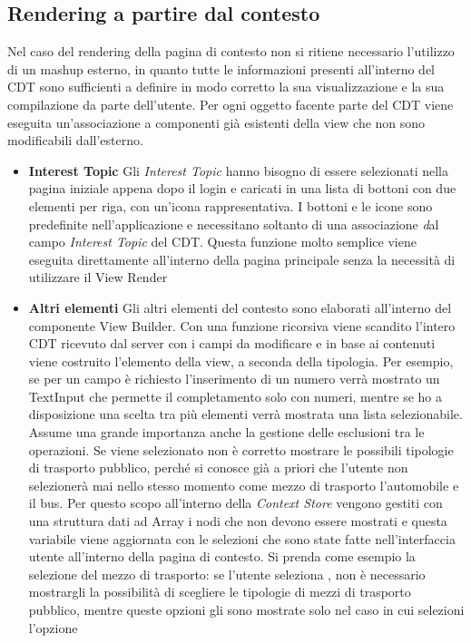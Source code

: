 \subsection{Rendering a partire dal contesto}

Nel caso del rendering della pagina di contesto non si ritiene necessario l'utilizzo di un mashup esterno, in quanto tutte le informazioni presenti all'interno del CDT sono sufficienti a definire in modo corretto la sua visualizzazione e la sua compilazione da parte dell'utente. %
Per ogni oggetto facente parte del CDT viene eseguita un'associazione a componenti già esistenti della view che non sono modificabili dall'esterno.

\begin{itemize}
	\item \textbf{Interest Topic}
	Gli \emph{Interest Topic} hanno bisogno di essere selezionati nella pagina iniziale appena dopo il login e caricati in una lista di bottoni con due elementi per riga, con un'icona rappresentativa. I bottoni e le icone sono predefinite nell'applicazione e necessitano soltanto di una associazione \emph<nome, elemento> dal campo \emph{Interest Topic} del CDT. Questa funzione molto semplice viene eseguita direttamente all'interno della pagina principale senza la necessità di utilizzare il View Render
	\item \textbf{Altri elementi}
	Gli altri elementi del contesto sono elaborati all'interno del componente View Builder. Con una funzione ricorsiva viene scandito l'intero CDT ricevuto dal server con i campi da modificare e in base ai contenuti viene costruito l'elemento della view, a seconda della tipologia. Per esempio, se per un campo è richiesto l'inserimento di un numero verrà mostrato un TextInput che permette il completamento solo con numeri, mentre se ho a disposizione una scelta tra più elementi verrà mostrata una lista selezionabile.
	Assume una grande importanza anche la gestione delle esclusioni tra le operazioni. Se viene selezionato  non è corretto mostrare le possibili tipologie di trasporto pubblico, perché si conosce già a priori che l'utente non selezionerà mai nello stesso momento come mezzo di trasporto l'automobile e il bus. Per questo scopo all'interno della \emph{Context Store} vengono gestiti con una struttura dati ad Array i nodi che non devono essere mostrati e questa variabile viene aggiornata con le selezioni che sono state fatte nell'interfaccia utente all'interno della pagina di contesto. Si prenda come esempio la selezione del mezzo di trasporto: se l'utente seleziona , non è necessario mostrargli la possibilità di scegliere le tipologie di mezzi di trasporto pubblico, mentre queste opzioni gli sono mostrate solo nel caso in cui selezioni l'opzione 
\end{itemize}
	
